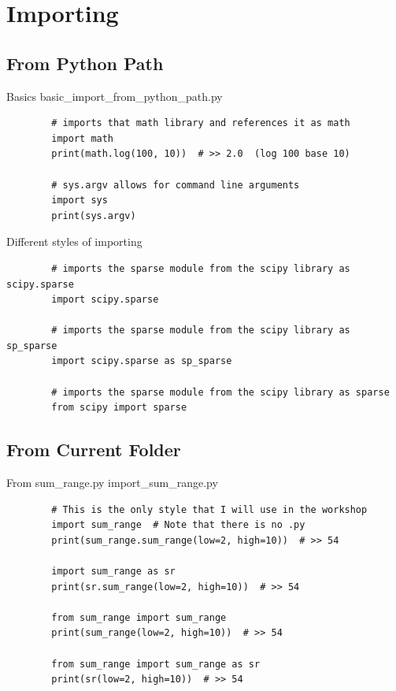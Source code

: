 \documentclass[11pt]{beamer}
\begin{document}
\section{Importing}
\subsection{From Python Path}
\begin{frame}[fragile]{Basics}
	basic\_import\_from\_python\_path.py
	\begin{lstlisting}
		# imports that math library and references it as math
		import math
		print(math.log(100, 10))  # >> 2.0  (log 100 base 10)
		
		# sys.argv allows for command line arguments
		import sys
		print(sys.argv)
	\end{lstlisting}
\end{frame}
		
\begin{frame}[fragile]{Different styles of importing}
	\begin{lstlisting}
		# imports the sparse module from the scipy library as scipy.sparse
		import scipy.sparse
		
		# imports the sparse module from the scipy library as sp_sparse
		import scipy.sparse as sp_sparse
		
		# imports the sparse module from the scipy library as sparse
		from scipy import sparse
	\end{lstlisting}
\end{frame}

\subsection{From Current Folder}
\begin{frame}[fragile]{From sum\_range.py}
	import\_sum\_range.py
	\begin{lstlisting}
		# This is the only style that I will use in the workshop
		import sum_range  # Note that there is no .py
		print(sum_range.sum_range(low=2, high=10))  # >> 54
		
		import sum_range as sr
		print(sr.sum_range(low=2, high=10))  # >> 54
		
		from sum_range import sum_range
		print(sum_range(low=2, high=10))  # >> 54
		
		from sum_range import sum_range as sr
		print(sr(low=2, high=10))  # >> 54
	\end{lstlisting}
\end{frame}
\end{document}
